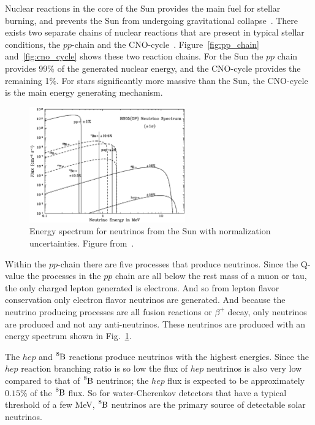 Nuclear reactions in the core of the Sun provides the main fuel for
stellar burning, and prevents the Sun from undergoing gravitational
collapse~\cite{bethe1, bethe2}.
There exists two separate chains of nuclear reactions that are present in typical
stellar conditions, the $pp$-chain and the CNO-cycle~\cite{bahcall_solar_neutrinos_theory}.
Figure~\ref{fig:pp_chain} and~\ref{fig:cno_cycle} shows these two reaction chains.
For the Sun the $pp$ chain
provides 99\% of the generated nuclear energy, and the CNO-cycle provides the remaining
1\%. For stars significantly more massive than the Sun, the CNO-cycle is the
main energy generating mechanism.

\begin{figure}[htbp]
\centering
\includegraphics[width=0.6\textwidth]{bs05op_spectrum}
\caption[Solar Neutrino Spectrum]{Energy spectrum for neutrinos from
the Sun with normalization uncertainties. Figure from~\cite{bs_ssm}.}
\label{fig:bs05_spectrum}
\end{figure}

Within the $pp$-chain there are five processes that produce neutrinos.
Since the Q-value the processes in the $pp$ chain are all below the rest mass
of a muon or tau, the only charged lepton generated is electrons. And so from
lepton flavor conservation only electron flavor neutrinos are generated.
And because the neutrino producing processes are all fusion reactions or
$\beta^{+}$ decay, only neutrinos are produced and not any anti-neutrinos.
These neutrinos are produced with an energy spectrum shown in Fig.~\ref{fig:bs05_spectrum}.

The $hep$ and $\ce{^{8}B}$ reactions produce neutrinos with the highest
energies. Since the $hep$ reaction branching ratio is so low the flux
of $hep$ neutrinos is also very low compared to that of $\ce{^{8}B}$ neutrinos;
the $hep$ flux is expected to be approximately $0.15\%$ of the $\ce{^{8}B}$ flux.
So for water-Cherenkov detectors that have a typical threshold of a few MeV, $\ce{^{8}B}$ neutrinos
are the primary source of detectable solar neutrinos.

